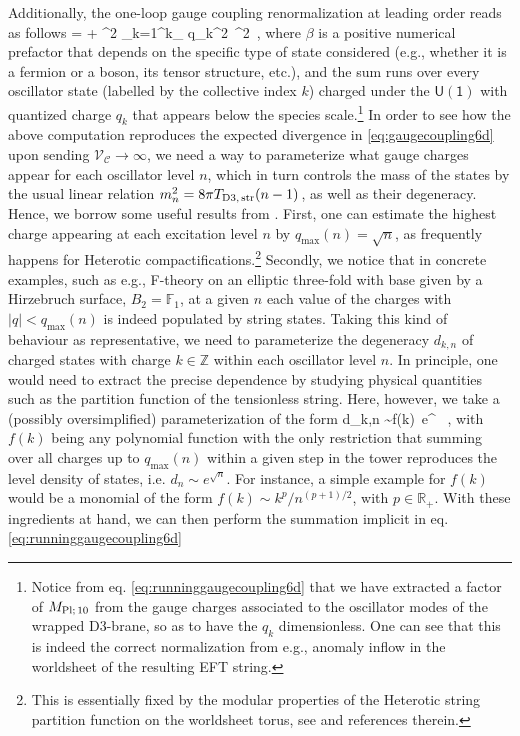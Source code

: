 Additionally, the one-loop gauge coupling renormalization at leading order reads as follows
%
\beq
		\label{eq:runninggaugecoupling6d}
		 =  + \beta \Mpt^2 \sum_{k=1}^{k_{}} q_k^2\, \LSP^2\, ,
\eeq
%
where $\beta$ is a positive numerical prefactor that depends on the specific type of state considered (e.g., whether it is a fermion or a boson, its tensor structure, etc.), and the sum runs over every oscillator state (labelled by the collective index $k$) charged under the $\mathsf{U(1)}$ with quantized charge $q_k$ that appears below the species scale.\footnote{Notice from eq. \eqref{eq:runninggaugecoupling6d} that we have extracted a factor of $M_{\text{Pl;}\, 10}$ from the gauge charges associated to the oscillator modes of the wrapped D3-brane, so as to have the $q_k$ dimensionless. One can see that this is indeed the correct normalization from e.g., anomaly inflow in the worldsheet of the resulting EFT string\cite{Callan:1984sa,Heidenreich:2021yda}.}  In order to see how the above computation reproduces the expected divergence in \eqref{eq:gaugecoupling6d} upon sending $\mathcal{V}_{\mathcal{C}} \to \infty$, we need a way to parameterize what gauge charges appear for each oscillator level $n$, which in turn controls the mass of the states by the usual linear relation $m_n^2 = 8\pi T_{\rm D3,\, str} (n-1) \,$, as well as their degeneracy. Hence, we borrow some useful results from  \cite{Lee:2018urn}. First, one can estimate the highest charge  appearing at each excitation level $n$ by $q_{\text{max}}(n)= \sqrt{n}$, as frequently happens for Heterotic compactifications.\footnote{\label{fn:modularity}This is essentially fixed by the modular properties of the Heterotic string partition function on the worldsheet torus, see \cite{Lee:2018urn} and references therein.} Secondly, we notice that in concrete examples, such as e.g., F-theory on an elliptic three-fold with base given by a Hirzebruch surface, $B_2=\mathbb{F}_1$, at a given $n$ each value of the charges with $|q| < q_{\text{max}}(n)$ is indeed populated by string states. Taking this kind of behaviour as representative, we need to parameterize the degeneracy $d_{k,n}$ of charged states with charge $k \in \mathbb{Z}$ within each oscillator level $n$. In principle, one would need to extract the precise dependence by studying physical quantities such as the partition function of the tensionless string. Here, however, we take a (possibly oversimplified) parameterization of the form
%
\beq
\label{eq:dmn}
	d_{k,n} \sim f(k)\, e^{} \ ,
\eeq
%
with $f(k)$ being any polynomial function with the only restriction that summing over all charges up to $q_{\text{max}}(n)$ within a given step in the tower reproduces the level density of states, i.e. $d_n \sim e^{\sqrt{n}}$. For instance, a simple example for $f(k)$ would be a monomial of the form $f(k) \sim k^p/n^{(p+1)/2}$, with $p \in \mathbb{R}_+$. With these ingredients at hand, we can then perform the summation implicit in eq. \eqref{eq:runninggaugecoupling6d}
